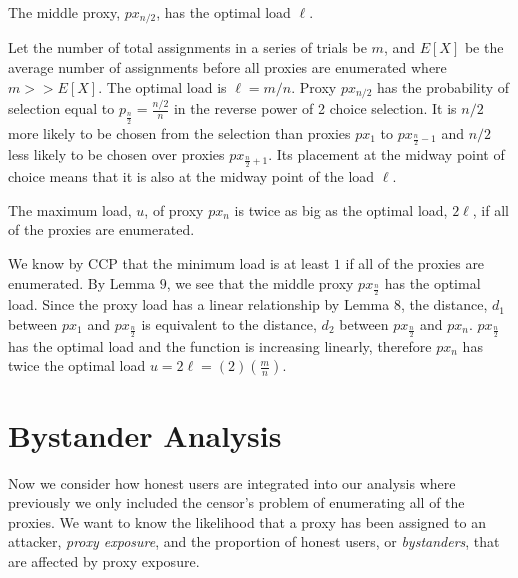 \begin{lemma}{The middle proxy, $px_{n/2}$, has the optimal load $\ell$.}

Let the number of total assignments in a series of trials be $m$, and $E[X]$ be the average number of assignments before all proxies are enumerated where $m>>E[X]$. The optimal load is $\ell=m/n$. Proxy $px_{n/2}$ has the probability of selection equal to $p_{\frac{n}{2}}=\frac{n/2}{n}$ in the reverse power of 2 choice selection. It is $n/2$ more likely to be chosen from the selection than proxies $px_1$ to $px_{\frac{n}{2} - 1}$ and $n/2$ less likely to be chosen over proxies $px_{\frac{n}{2} + 1}$. Its placement at the midway point of choice means that it is also at the midway point of the load $\ell$. 
\end{lemma}

\begin{theorem}{The maximum load, $u$, of proxy $px_n$ is twice as big as the optimal load, $2\ell$, if all of the proxies are enumerated.}

We know by CCP that the minimum load is at least $1$ if all of the proxies are enumerated. By Lemma $9$, we see that the middle proxy $px_{\frac{n}{2}}$ has the optimal load. Since the proxy load has a linear relationship by Lemma $8$, the distance, $d_1$ between $px_1$ and $px_{\frac{n}{2}}$ is equivalent to the distance, $d_2$ between $px_{\frac{n}{2}}$ and $px_n$. $px_{\frac{n}{2}}$ has the optimal load and the function is increasing linearly, therefore $px_{n}$ has twice the optimal load $u = 2\ell =(2)(\frac{m}{n})$.

\end{theorem}

\label{sec:bystander}
\section{Bystander Analysis}

Now we consider how honest users are integrated into our analysis where previously we only included the censor's problem of enumerating all of the proxies. We want to know the likelihood that a proxy has been assigned to an attacker, \textit{proxy exposure}, and the proportion of honest users, or \textit{bystanders}, that are affected by proxy exposure.

